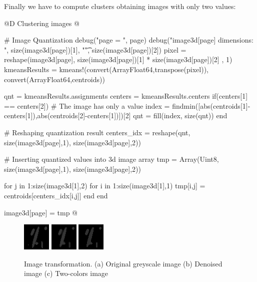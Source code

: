 \documentclass[11pt,oneside]{article}	%
\begin{document}
Finally we have to compute clusters obtaining images with only two values:

@D Clustering images
@{# Image Quantization
debug("page = ", page)
debug("image3d[page] dimensions: ", size(image3d[page])[1], "\t", size(image3d[page])[2])
pixel = reshape(image3d[page], size(image3d[page])[1] * size(image3d[page])[2] , 1)
kmeansResults = kmeans!(convert(Array{Float64},transpose(pixel)),
                convert(Array{Float64},centroids))

qnt = kmeansResults.assignments
centers = kmeansResults.centers
if(centers[1] == centers[2])
  # The image has only a value
  index = findmin([abs(centroids[1]-centers[1]),abs(centroids[2]-centers[1])])[2]
  qnt = fill(index, size(qnt))
end

# Reshaping quantization result
centers_idx = reshape(qnt, size(image3d[page],1), size(image3d[page],2))

# Inserting quantized values into 3d image array
tmp = Array(Uint8, size(image3d[page],1), size(image3d[page],2))

for j in 1:size(image3d[1],2)
  for i in 1:size(image3d[1],1)
    tmp[i,j] = centroids[centers_idx[i,j]]
  end
end

image3d[page] = tmp @}

\begin{figure}[htb] %
   \centering
   \includegraphics[width=0.30\linewidth]{images/grayscalesample.png} \hfill
   \includegraphics[width=0.30\linewidth]{images/denoised.png} \hfill
   \includegraphics[width=0.30\linewidth]{images/quantized.png} \hfill
   \caption{Image transformation. (a) Original greyscale image (b) Denoised image (c) Two-colors image}
   \label{fig:rawImage}
\end{figure}
\end{document}
